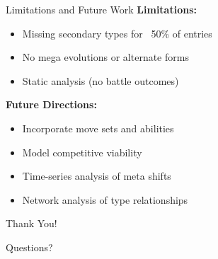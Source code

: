 \documentclass[t,aspectratio=169,12pt]{beamer}
\begin{document}
\begin{frame}{Limitations and Future Work}
  \textbf{Limitations:}
  {\small\begin{itemize}
    \item Missing secondary types for ~50\% of entries
    \item No mega evolutions or alternate forms
    \item Static analysis (no battle outcomes)
  \end{itemize}}
  
  \vspace{0.2cm}
  \textbf{Future Directions:}
  {\small\begin{itemize}
    \item Incorporate move sets and abilities
    \item Model competitive viability
    \item Time-series analysis of meta shifts
    \item Network analysis of type relationships
  \end{itemize}}
\end{frame}

\begin{frame}
  \vspace*{0.45\textheight}
  \centering
  \Huge Thank You!
  
  \vspace{0.5cm}
  \Large Questions?
\end{frame}
\end{document}
